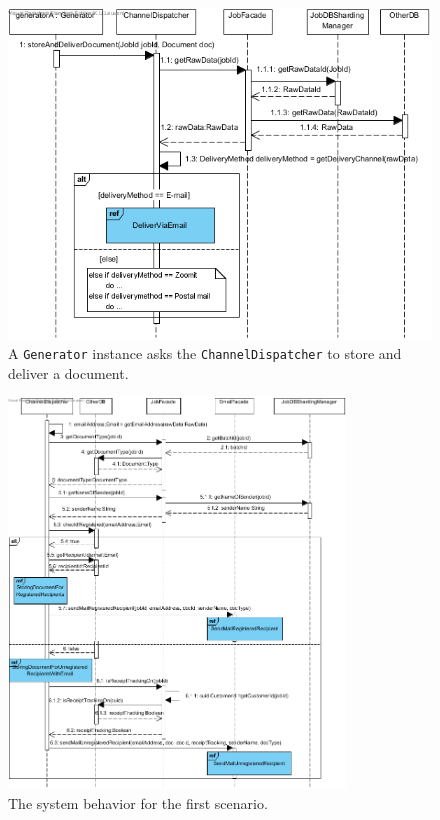 \documentclass[a4paper,10pt]{article}
\begin{document}
\begin{figure}[!htp]
    \centering
    \includegraphics[width=\textwidth]{InitiateDocumentDelivery.png}
    \caption{A \texttt{Generator} instance asks the \texttt{ChannelDispatcher} to store and deliver a document.
        }\label{fig:seq_InitiateDocumentdelivery}
\end{figure}

\begin{figure}[!htp]
    \centering
    \includegraphics[width=0.8\textwidth]{DeliverViaEmail.png}
    \caption{The system behavior for the first scenario.
        }\label{fig:seq_DeliverViaEmail}
\end{figure}
\end{document}
